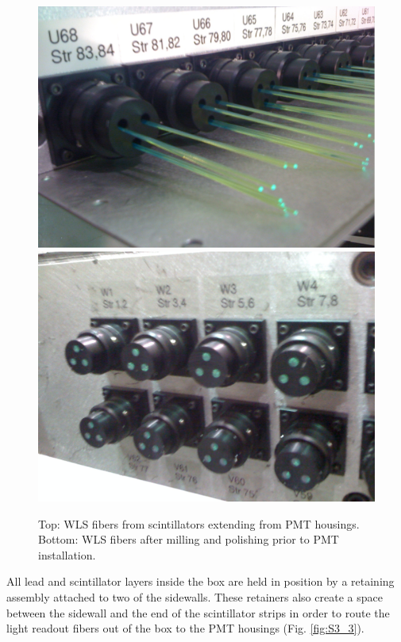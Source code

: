 \begin{figure}[hbt]
\centering
\includegraphics[width=0.9\columnwidth,keepaspectratio]{img/S3_5a.png}
\includegraphics[width=0.9\columnwidth,keepaspectratio]{img/S3_5b.png}
\caption[PCAL UVW Layers]{Top: WLS fibers from scintillators extending from PMT housings. Bottom: WLS fibers after milling and polishing prior to PMT installation.}
\label{fig:S3_5}
\end{figure}

All lead and scintillator layers inside the box are held in position by a retaining assembly attached to two of the sidewalls.  These retainers also create a space between the sidewall and the end of the scintillator strips in order to route the light readout fibers out of the box to the PMT housings (Fig. \ref{fig:S3_3}). 

